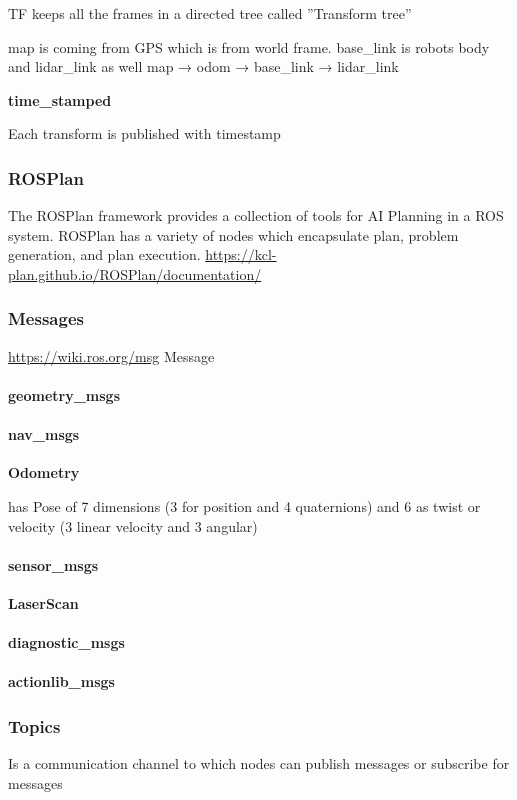 \documentclass{book}
\providecommand{\ProjectDeepHeading}[2]{%
    \par\medskip\noindent\textbf{#2}\par\smallskip
}
\begin{document}
    TF keeps all the frames in a directed tree called ''Transform tree''
    
    
    map is coming from GPS which is from world frame. base\_link is robots body and lidar\_link as well
    map → odom → base\_link → lidar\_link
    
    \ProjectDeepHeading{1}{time\_stamped}
        Each transform is published with timestamp
        
\subsubsection{ROSPlan}
    The ROSPlan framework provides a collection of tools for AI Planning in a ROS system. ROSPlan has a variety of nodes which encapsulate plan, problem generation, and plan execution.
    \url{https://kcl-plan.github.io/ROSPlan/documentation/}
\subsubsection{Messages}
    \url{https://wiki.ros.org/msg}
    Message 
    \paragraph{geometry\_msgs}
    \paragraph{nav\_msgs}
        \ProjectDeepHeading{1}{Odometry}
            has Pose of 7 dimensions (3 for position and 4 quaternions) and 6 as twist or velocity (3 linear velocity and 3 angular)
    \paragraph{sensor\_msgs}
        \ProjectDeepHeading{1}{LaserScan}
    \paragraph{diagnostic\_msgs}
    \paragraph{actionlib\_msgs}
\subsubsection{Topics}
    Is a communication channel to which nodes can publish messages or subscribe for messages
\end{document}
